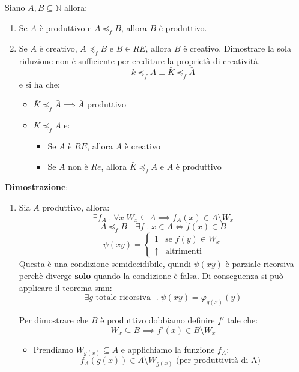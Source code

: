 \documentclass[a4paper]{article}
\begin{document}
\begin{theorem}
  Siano \( A, B \subseteq \mathbb{N} \) allora: 
\label{thm:produttivo}
  \begin{enumerate}
    \item  Se \( A \) è produttivo e \( A \preceq_f B \),
      allora \( B \) è produttivo.

    \item Se \( A \) è creativo, \( A \preceq_f B \) e \( B \in RE \),
      allora \( B \) è creativo. Dimostrare la sola riduzione non è sufficiente
      per ereditare la proprietà di creatività.
      \[
        k \preceq_f A \equiv \bar{K} \preceq_f \bar{A}
      \] 
      e si ha che:
      \begin{itemize}
        \item \( \bar{K} \preceq_f \bar{A} \implies \bar{A} \text{ produttivo} \)
        \item \( K \preceq_f A \) e:
          \begin{itemize}
            \item Se \( A \) è \( RE \), allora \( A \) è creativo
            \item Se \( A \) non è \( Re \), allora \( \bar{K} \preceq_f A \) e
              \( A \) è produttivo
          \end{itemize}
      \end{itemize}
  \end{enumerate}

  \vspace{1em}
  \noindent
  \textbf{Dimostrazione}:
  \begin{enumerate}
    \item Sia \( A \) produttivo, allora:
      \[
        \exists f_A \;.\; \forall x \; W_x \subseteq A \implies f_A(x) \in A \setminus W_x
      \] 
      \[
        A \preceq_f B \quad \exists f \;.\; x \in A \iff f(x) \in B
      \] 
      \[
        \psi(xy) =
        \begin{cases}
          1 & \text{se } f(y) \in W_x\\
          \uparrow & \text{altrimenti}
        \end{cases}
      \] 
      Questa è una condizione semidecidibile, quindi \( \psi(xy) \) è parziale ricorsiva
      perchè diverge \textbf{solo} quando la condizione è falsa. Di conseguenza si
      può applicare il teorema smn:
      \[
        \exists g \text{ totale ricorsiva } \;.\; \psi(xy) = \varphi_{g(x)}(y)
      \] 

      \vspace{1em}
      \noindent
      Per dimostrare che \( B \) è produttivo dobbiamo definire \( f' \) tale
      che:
      \[
        W_x \subseteq B \implies f'(x) \in B \setminus W_x
      \] 
      \begin{itemize}
        \item 
          Prendiamo \( W_{g(x)} \subseteq A \) e applichiamo la funzione \( f_A \):
          \[
            f_A(g(x)) \in A \setminus W_{g(x)} \text{ (per produttività di A)}
          \] 


\end{itemize}
\end{enumerate}
\end{theorem}
\end{document}

